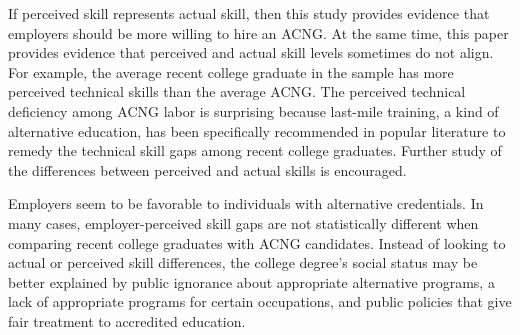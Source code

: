\documentclass[review]{elsarticle}
\begin{document}
If perceived skill represents actual skill, then this study provides evidence that employers should be more willing to hire an ACNG.
At the same time, this paper provides evidence that perceived and actual skill levels sometimes do not align.
For example, the average recent college graduate in the sample has more perceived technical skills than the average ACNG.
The perceived technical deficiency among ACNG labor is surprising because last-mile training, a kind of alternative education, has been specifically recommended in popular literature to remedy the technical skill gaps among recent college graduates.
Further study of the differences between perceived and actual skills is encouraged.

Employers seem to be favorable to individuals with alternative credentials.
In many cases, employer-perceived skill gaps are not statistically different when comparing recent college graduates with ACNG candidates.
Instead of looking to actual or perceived skill differences,
the college degree's social status may be better explained by public ignorance about appropriate alternative programs,
a lack of appropriate programs for certain occupations, and public policies that give fair treatment to accredited education.



\end{document}
